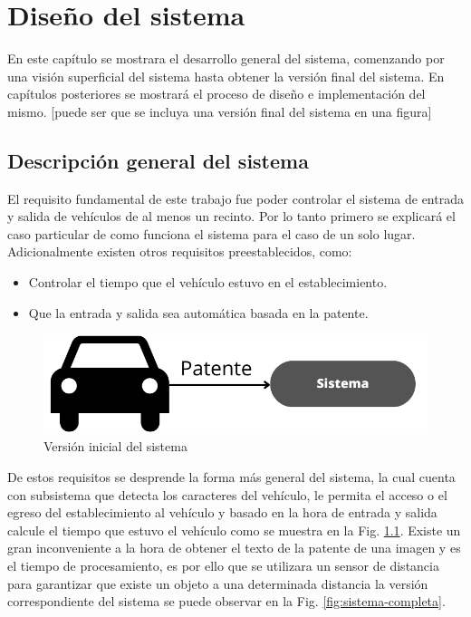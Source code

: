 \chapter{Diseño del sistema}

En este capítulo se mostrara el desarrollo general del sistema, comenzando por una visión superficial del sistema hasta obtener la versión final del sistema. En capítulos posteriores se mostrará el proceso de diseño e implementación del mismo. [puede ser que se incluya una versión final del sistema en una figura]

\section{Descripción general del sistema}

El requisito fundamental de este trabajo fue poder controlar el sistema de entrada y salida de vehículos de al menos un recinto. Por lo tanto primero se explicará el caso particular de como funciona el sistema para el caso de un solo lugar. Adicionalmente existen otros requisitos preestablecidos, como:

\begin{itemize}
    \item Controlar el tiempo que el vehículo estuvo en el establecimiento.
    \item Que la entrada y salida sea automática basada en la patente.
\end{itemize}

\begin{figure}
    \centering
    \includegraphics[width=.8\textwidth]{imgs/sistema-base.png}
    \caption{Versión inicial del sistema}
    \label{fig:sistema-base}
\end{figure}

De estos requisitos se desprende la forma más general del sistema, la cual cuenta con subsistema que detecta los caracteres del vehículo, le permita el acceso o el egreso del establecimiento al vehículo y basado en la hora de entrada y salida calcule el tiempo que estuvo el vehículo como se muestra en la Fig. \ref{fig:sistema-base}. Existe un gran inconveniente a la hora de obtener el texto de la patente de una imagen y es el tiempo de procesamiento, es por ello que se utilizara un sensor de distancia para garantizar que existe un objeto a una determinada distancia la versión correspondiente del sistema se puede observar en la Fig. \ref{fig:sistema-completa}.

